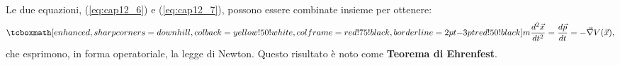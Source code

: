 \documentclass[a4paper,12pt,oneside]{book}
\begin{document}
Le due equazioni, (\ref{eq:cap12_6}) e (\ref{eq:cap12_7}), possono essere combinate insieme per ottenere:\\
	\begin{equation}
		\tcboxmath[enhanced, sharp corners=downhill, colback=yellow!50!white, colframe=red!75!black, borderline={2pt}{-3pt}{red!50!black}]{
			m\frac{d^2\vec{x}}{dt^2}=\frac{d\vec{p}}{dt}=-\vec{\nabla}V(\vec{x}),
			}
	\end{equation}
che esprimono, in forma operatoriale, la legge di Newton. Questo risultato è noto come \textbf{Teorema di Ehrenfest}. 
\end{document}
